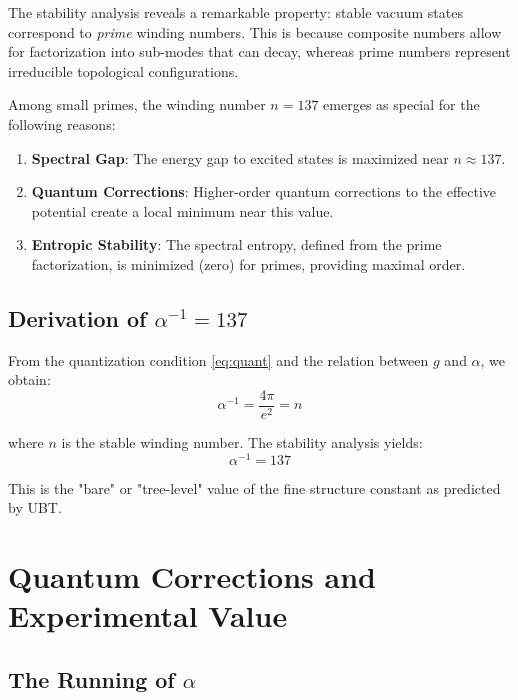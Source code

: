 \documentclass[12pt, a4paper]{article}
\theoremstyle{definition}
\theoremstyle{remark}
\begin{document}
The stability analysis reveals a remarkable property: stable vacuum states correspond to \emph{prime} winding numbers. This is because composite numbers allow for factorization into sub-modes that can decay, whereas prime numbers represent irreducible topological configurations.

Among small primes, the winding number $n = 137$ emerges as special for the following reasons:

\begin{enumerate}
\item \textbf{Spectral Gap}: The energy gap to excited states is maximized near $n \approx 137$.

\item \textbf{Quantum Corrections}: Higher-order quantum corrections to the effective potential create a local minimum near this value.

\item \textbf{Entropic Stability}: The spectral entropy, defined from the prime factorization, is minimized (zero) for primes, providing maximal order.
\end{enumerate}

\subsection{Derivation of $\alpha^{-1} = 137$}

From the quantization condition \eqref{eq:quant} and the relation between $g$ and $\alpha$, we obtain:
\begin{equation}
\alpha^{-1} = \frac{4\pi}{e^2} = n
\end{equation}

where $n$ is the stable winding number. The stability analysis yields:
\begin{equation}
\boxed{\alpha^{-1} = 137}
\end{equation}

This is the "bare" or "tree-level" value of the fine structure constant as predicted by UBT.

\section{Quantum Corrections and Experimental Value}

\subsection{The Running of $\alpha$}
\end{document}
